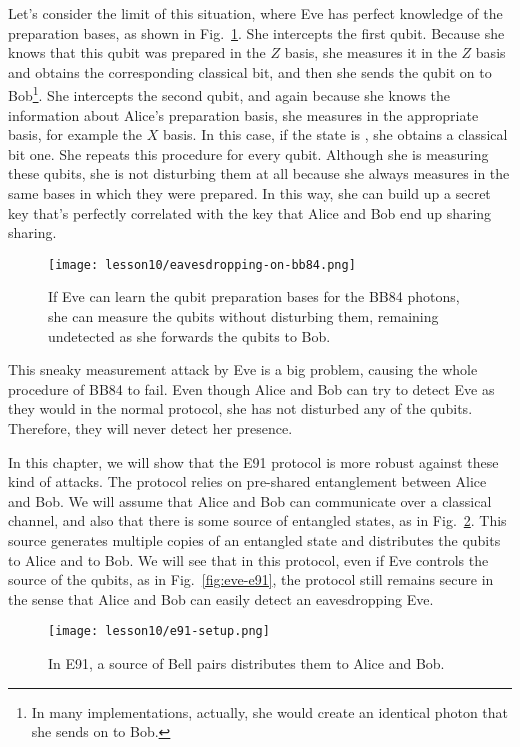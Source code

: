 Let's consider the limit of this situation, where Eve has perfect knowledge of the preparation bases, as shown in Fig.~\ref{fig:eve-bb84}.
She intercepts the first qubit.
Because she knows that this qubit was prepared in the $Z$ basis, she measures it in the $Z$ basis and obtains the corresponding classical bit, and then she sends the qubit on to Bob\footnote{In many implementations, actually, she would create an identical photon that she sends on to Bob.}.
She intercepts the second qubit, and again because she knows the information about Alice's preparation basis, she measures in the appropriate basis, for example the $X$ basis.
In this case, if the state is \ket{-}, she obtains a classical bit one. She repeats this procedure for every qubit.
Although she is measuring these qubits, she is not disturbing them at all because she always measures in the same bases in which they were prepared.
In this way, she can build up a secret key that's perfectly correlated with the key that Alice and Bob end up sharing sharing.
\begin{figure}[t]
    \centering
    \texttt{[image: lesson10/eavesdropping-on-bb84.png]}
    \caption[Successful eavesdropping on BB84.]{If Eve can learn the qubit preparation bases for the BB84 photons, she can measure the qubits without disturbing them, remaining undetected as she forwards the qubits to Bob.}
    \label{fig:eve-bb84}
\end{figure}
This sneaky measurement attack by Eve is a big problem, causing the whole procedure of BB84 to fail.
Even though Alice and Bob can try to detect Eve as they would in the normal protocol, she has not disturbed any of the qubits.
Therefore, they will never detect her presence.

In this chapter, we will show that the E91 protocol is more robust against these kind of attacks.
The protocol relies on pre-shared entanglement between Alice and Bob.
We will assume that Alice and Bob can communicate over a classical channel, and also that there is some source of entangled states, as in Fig.~\ref{fig:e91-setup}.
This source generates multiple copies of an entangled state and distributes the qubits to Alice and to Bob.
We will see that in this protocol, even if Eve controls the source of the qubits, as in Fig.~\ref{fig:eve-e91}, the protocol still remains secure in the sense that Alice and Bob can easily detect an eavesdropping Eve.

\begin{figure}[H]
    \centering
    \texttt{[image: lesson10/e91-setup.png]}
        \caption[E91 setup.]{In E91, a source of Bell pairs distributes them to Alice and Bob.}
    \label{fig:e91-setup}
\end{figure}

